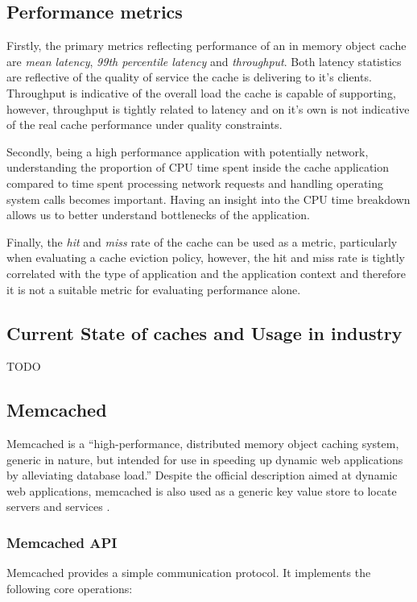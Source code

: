 \subsection{Performance metrics}
Firstly, the primary metrics reflecting performance of an in memory object cache are \textit{mean latency}, \textit{99th percentile latency} and \textit{throughput}. Both latency statistics are reflective of the quality of service the cache is delivering to it's clients. Throughput is indicative of the overall load the cache is capable of supporting, however, throughput is tightly related to latency and on it's own is not indicative of the real cache performance under quality constraints.

Secondly, being a high performance application with potentially network, understanding the proportion of CPU time spent inside the cache application compared to time spent processing network requests and handling operating system calls becomes important. Having an insight into the CPU time breakdown allows us to better understand bottlenecks of the application.

Finally, the \textit{hit} and \textit{miss} rate of the cache can be used as a metric, particularly when evaluating a cache eviction policy, however, the hit and miss rate is tightly correlated with the type of application and the application context and therefore it is not a suitable metric for evaluating performance alone.


\subsection{Current State of caches and Usage in industry}
TODO


\subsection{Memcached}

Memcached is a ``high-performance, distributed memory object caching system, generic in nature, but intended for use in speeding up dynamic web applications by alleviating database load.'' \cite{interactive2006memcached} Despite the official description aimed at dynamic web applications, memcached is also used as a generic key value store to locate servers and services \cite{atikoglu2012workload}.

\subsubsection{Memcached API}
Memcached provides a simple communication protocol. It implements the following core operations:

